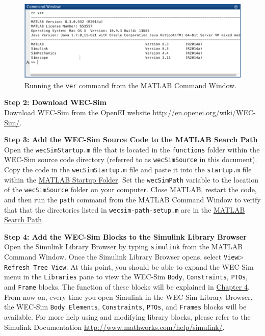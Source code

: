 \begin{figure}[H]
\noindent \begin{centering}
\includegraphics[scale=0.4]{gettingStarted/Figures/installMATLAB}
\protect\caption {Running the \texttt{ver} command from the MATLAB Command Window.}
\par\end{centering}
\end{figure}

\textbf{Step 2: Download WEC-Sim}\\
Download WEC-Sim from the OpenEI website \href{http://en.openei.org/wiki/WEC-Sim/}{http://en.openei.org/wiki/WEC-Sim/}.

\textbf{Step 3: Add the WEC-Sim Source Code to the MATLAB Search Path}\\
Open the \texttt{wecSimStartup.m} file that is located in the \texttt{functions} folder within the WEC-Sim source code directory (referred to as \texttt{wecSimSource} in this document). Copy the code in the \texttt{wecSimStartup.m} file and paste it into the \texttt{startup.m} file within the \href{http://www.mathworks.com/help/matlab/matlab_env/matlab-startup-folder.html}{MATLAB Startup Folder}. Set the \texttt{wecSimPath} variable to the location of the \texttt{wecSimSource} folder on your computer. Close MATLAB, restart the code, and then run the \texttt{path} command from the MATLAB Command Window to verify that that the directories listed in \texttt{wecsim-path-setup.m} are in the \href{http://www.mathworks.com/help/matlab/search-path.html}{MATLAB Search Path}.

\textbf{Step 4: Add the WEC-Sim Blocks to the Simulink Library Browser}\\
Open the Simulink Library Browser by typing \texttt{simulink} from the MATLAB Command Window. Once the Simulink Library Browser opens, select \texttt{View}$\rhd$\texttt{Refresh Tree View}. At this point, you should be able to expand the WEC-Sim menu in the \texttt{Libraries} pane to view the WEC-Sim \texttt{Body}, \texttt{Constraints}, \texttt{PTOs}, and \texttt{Frame} blocks. The function of these blocks will be explained in \hyperlink{chapter.4}{Chapter 4}. From now on, every time you open Simulink in the WEC-Sim Library Browser, the WEC-Sim \texttt{Body Elements}, \texttt{Constraints}, \texttt{PTOs}, and \texttt{Frames} blocks will be available. For more help using and modifying library blocks, please refer to the Simulink Documentation \href{http://www.mathworks.com/help/simulink/}{http://www.mathworks.com/help/simulink/}.

